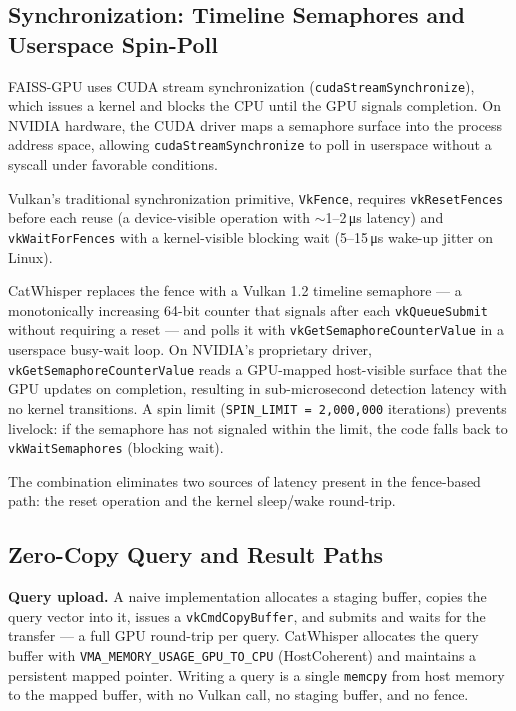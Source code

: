 \documentclass[conference]{IEEEtran}
\begin{document}
\subsection{Synchronization: Timeline Semaphores and Userspace Spin-Poll}

FAISS-GPU uses CUDA stream synchronization (\texttt{cudaStreamSynchronize}),
which issues a kernel and blocks the CPU until the GPU signals completion.
On NVIDIA hardware, the CUDA driver maps a semaphore surface into the
process address space, allowing \texttt{cudaStreamSynchronize} to poll in
userspace without a syscall under favorable conditions.

Vulkan's traditional synchronization primitive, \texttt{VkFence}, requires
\texttt{vkResetFences} before each reuse (a device-visible operation with
$\sim$1--2\,\si{\micro\second} latency) and
\texttt{vkWaitForFences} with a kernel-visible blocking wait (5--15\,\si{\micro\second}
wake-up jitter on Linux).

CatWhisper replaces the fence with a Vulkan 1.2 timeline semaphore ---
a monotonically increasing 64-bit counter that signals after each
\texttt{vkQueueSubmit} without requiring a reset --- and polls it with
\texttt{vkGetSemaphoreCounterValue} in a userspace busy-wait loop.  On
NVIDIA's proprietary driver, \texttt{vkGetSemaphoreCounterValue} reads a
GPU-mapped host-visible surface that the GPU updates on completion,
resulting in sub-microsecond detection latency with no kernel transitions.
A spin limit (\texttt{SPIN\_LIMIT = 2{,}000{,}000} iterations) prevents
livelock: if the semaphore has not signaled within the limit, the code falls
back to \texttt{vkWaitSemaphores} (blocking wait).

The combination eliminates two sources of latency present in the fence-based
path: the reset operation and the kernel sleep/wake round-trip.

\subsection{Zero-Copy Query and Result Paths}

\textbf{Query upload.}  A naive implementation allocates a staging buffer,
copies the query vector into it, issues a \texttt{vkCmdCopyBuffer}, and
submits and waits for the transfer --- a full GPU round-trip per query.
CatWhisper allocates the query buffer with
\texttt{VMA\_MEMORY\_USAGE\_GPU\_TO\_CPU} (HostCoherent) and maintains a
persistent mapped pointer.  Writing a query is a single \texttt{memcpy}
from host memory to the mapped buffer, with no Vulkan call, no staging
buffer, and no fence.
\end{document}
